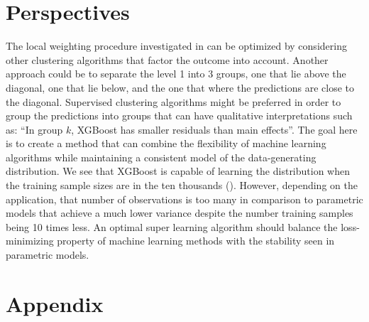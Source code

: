 \documentclass[11pt, a4paper]{article}
\theoremstyle{definition}
\theoremstyle{remark}
\begin{document}
\section{Perspectives}
The local weighting procedure investigated in  can be optimized by considering other clustering algorithms that factor the outcome into account. Another approach could be to separate the level 1 into 3 groups, one that lie above the diagonal, one that lie below, and the one that where the predictions are close to the diagonal. Supervised clustering algorithms might be preferred in order to group the predictions into groups that can have qualitative interpretations such as: ``In group $ k $, XGBoost has smaller residuals than main effects''. The goal here is to create a method that can combine the flexibility of machine learning algorithms while maintaining a consistent model of the data-generating distribution. We see that XGBoost is capable of learning the distribution when the training sample sizes are in the ten thousands (). However, depending on the application, that number of observations is too many in comparison to parametric models that achieve a much lower variance despite the number training samples being 10 times less. An optimal super learning algorithm should balance the loss-minimizing property of machine learning methods with the stability seen in parametric models. 



\newpage

\section{Appendix}
\end{document}
